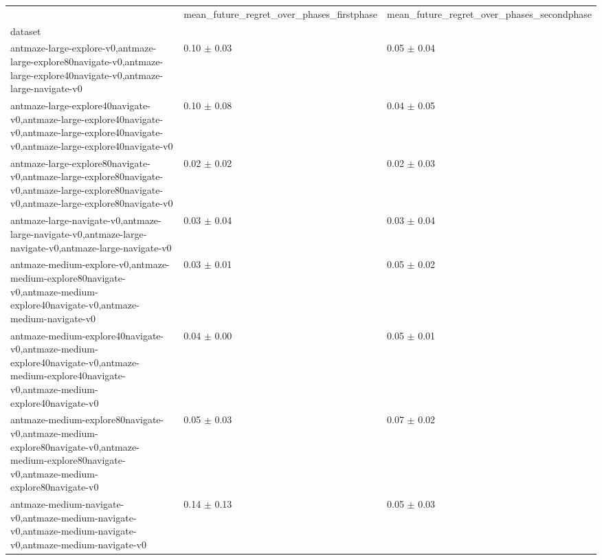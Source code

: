 \begin{tabular}{lll}
\toprule
 & mean_future_regret_over_phases_firstphase & mean_future_regret_over_phases_secondphase \\
dataset &  &  \\
\midrule
antmaze-large-explore-v0,antmaze-large-explore80navigate-v0,antmaze-large-explore40navigate-v0,antmaze-large-navigate-v0 & 0.10 $\pm$ 0.03 & 0.05 $\pm$ 0.04 \\
antmaze-large-explore40navigate-v0,antmaze-large-explore40navigate-v0,antmaze-large-explore40navigate-v0,antmaze-large-explore40navigate-v0 & 0.10 $\pm$ 0.08 & 0.04 $\pm$ 0.05 \\
antmaze-large-explore80navigate-v0,antmaze-large-explore80navigate-v0,antmaze-large-explore80navigate-v0,antmaze-large-explore80navigate-v0 & 0.02 $\pm$ 0.02 & 0.02 $\pm$ 0.03 \\
antmaze-large-navigate-v0,antmaze-large-navigate-v0,antmaze-large-navigate-v0,antmaze-large-navigate-v0 & 0.03 $\pm$ 0.04 & 0.03 $\pm$ 0.04 \\
antmaze-medium-explore-v0,antmaze-medium-explore80navigate-v0,antmaze-medium-explore40navigate-v0,antmaze-medium-navigate-v0 & 0.03 $\pm$ 0.01 & 0.05 $\pm$ 0.02 \\
antmaze-medium-explore40navigate-v0,antmaze-medium-explore40navigate-v0,antmaze-medium-explore40navigate-v0,antmaze-medium-explore40navigate-v0 & 0.04 $\pm$ 0.00 & 0.05 $\pm$ 0.01 \\
antmaze-medium-explore80navigate-v0,antmaze-medium-explore80navigate-v0,antmaze-medium-explore80navigate-v0,antmaze-medium-explore80navigate-v0 & 0.05 $\pm$ 0.03 & 0.07 $\pm$ 0.02 \\
antmaze-medium-navigate-v0,antmaze-medium-navigate-v0,antmaze-medium-navigate-v0,antmaze-medium-navigate-v0 & 0.14 $\pm$ 0.13 & 0.05 $\pm$ 0.03 \\
\bottomrule
\end{tabular}
